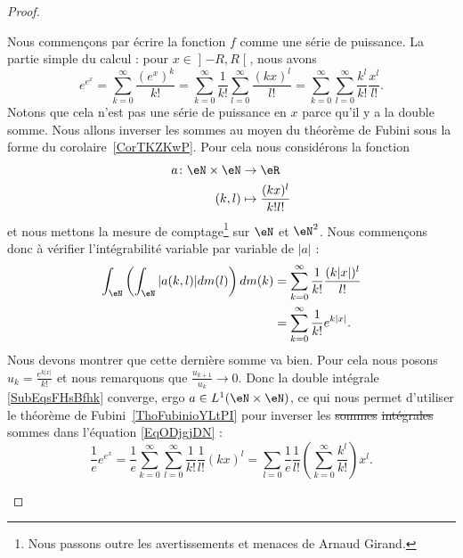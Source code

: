 \begin{proof}
\begin{enumerate}
		      Nous commençons par écrire la fonction \( f\) comme une série de puissance. La partie simple du calcul : pour \( x\in \mathopen] -R , R \mathclose[\), nous avons
		      \begin{equation}    \label{EqODjgjDN}
			      e^{e^x}=\sum_{k=0}^{\infty}\frac{ (e^x)^k }{ k! }=\sum_{k=0}^{\infty}\frac{1}{ k! }\sum_{l=0}^{\infty}\frac{ (kx)^l }{ l! }=\sum_{k=0}^{\infty}\sum_{l=0}^{\infty}\frac{k^l}{k! }\frac{ x^l }{ l! }.
		      \end{equation}
		      Notons que cela n'est pas une série de puissance en \( x\) parce qu'il y a la double somme. Nous allons inverser les sommes au moyen du théorème de Fubini sous la forme du corolaire~\ref{CorTKZKwP}. Pour cela nous considérons la fonction
		      \begin{equation}
			      \begin{aligned}
				      a\colon \eN\times \eN & \to \eR                         \\
				      (k,l)                 & \mapsto \frac{ (kx)^l }{ k!l! }
			      \end{aligned}
		      \end{equation}
		      et nous mettons la mesure de comptage\footnote{Nous passons outre les avertissements et menaces de Arnaud Girand.} sur \( \eN\) et \( \eN^2\). Nous commençons donc à vérifier l'intégrabilité variable par variable de \( | a |\) :
		      \begin{subequations}    \label{SubEqsFHsBfhk}
			      \begin{align}
				      \int_{\eN}\left( \int_{\eN}| a(k,l) |dm(l) \right)dm(k) & =\sum_{k=0}^{\infty}\frac{1}{ k! }\frac{ (k| x |)^l }{ l! } \\
				                                                              & =\sum_{k=0}^{\infty}\frac{1}{ k! } e^{k| x |}.
			      \end{align}
		      \end{subequations}
		      Nous devons montrer que cette dernière somme va bien. Pour cela nous posons \( u_k=\frac{ e^{k| x |} }{ k! }\) et nous remarquons que \( \frac{ u_{k+1} }{ u_k }\to 0\). Donc la double intégrale \eqref{SubEqsFHsBfhk} converge, ergo \( a\in L^1(\eN\times \eN)\), ce qui nous permet d'utiliser le théorème de Fubini~\ref{ThoFubinioYLtPI} pour inverser les \sout{sommes} \sout{intégrales} sommes dans l'équation \eqref{EqODjgjDN} :
		      \begin{equation}
			      \frac{1}{ e }e^{e^x}=\frac{1}{ e }\sum_{k=0}^{\infty}\sum_{l=0}^{\infty}\frac{1}{ k! }\frac{1}{ l! }(kx)^l=\sum_{l=0}\frac{1}{ e }\frac{1}{ l! }\left( \sum_{k=0}^{\infty}\frac{ k^l }{ k! } \right)x^l.

\end{equation}
\end{enumerate}
\end{proof}
